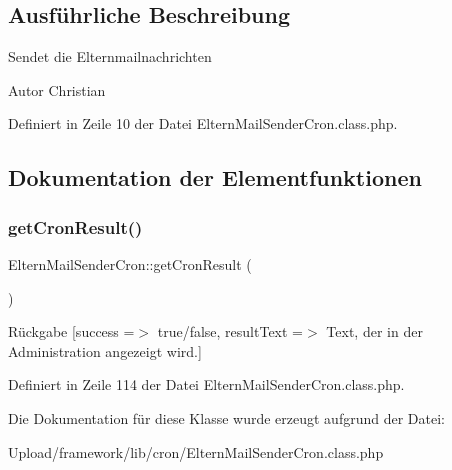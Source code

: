 \subsection{Ausführliche Beschreibung}
Sendet die Elternmailnachrichten \begin{DoxyAuthor}{Autor}
Christian 
\end{DoxyAuthor}


Definiert in Zeile 10 der Datei Eltern\+Mail\+Sender\+Cron.\+class.\+php.



\subsection{Dokumentation der Elementfunktionen}
\mbox{\label{class_eltern_mail_sender_cron_a0462d511a20e053b568e4ccf58f0fe6d}} 
\subsubsection{\texorpdfstring{get\+Cron\+Result()}{getCronResult()}}
{\footnotesize\ttfamily Eltern\+Mail\+Sender\+Cron\+::get\+Cron\+Result (\begin{DoxyParamCaption}{ }\end{DoxyParamCaption})}

\begin{DoxyReturn}{Rückgabe}
\mbox{[}\textquotesingle{}success\textquotesingle{} =$>$ \textquotesingle{}true/false\textquotesingle{}, \textquotesingle{}result\+Text\textquotesingle{} =$>$ \textquotesingle{}Text, der in der Administration angezeigt wird.\textquotesingle{}\mbox{]} 
\end{DoxyReturn}


Definiert in Zeile 114 der Datei Eltern\+Mail\+Sender\+Cron.\+class.\+php.



Die Dokumentation für diese Klasse wurde erzeugt aufgrund der Datei\+:\begin{DoxyCompactItemize}
\item 
Upload/framework/lib/cron/Eltern\+Mail\+Sender\+Cron.\+class.\+php\end{DoxyCompactItemize}
